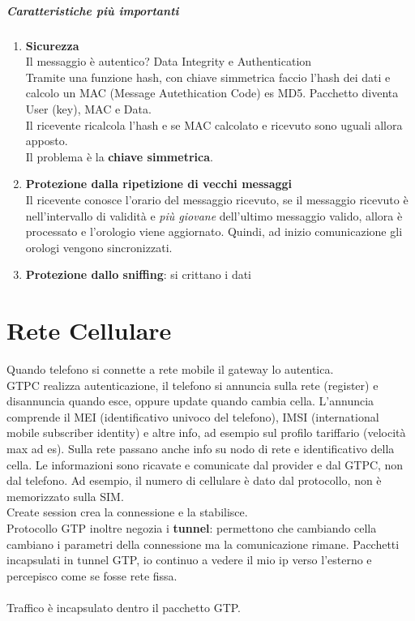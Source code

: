 \documentclass[10pt]{book}
\begin{document}
\paragraph{Caratteristiche più importanti} 
\begin{enumerate}
	\item \textbf{Sicurezza}\\
	Il messaggio è autentico? Data Integrity e Authentication\\
	Tramite una funzione hash, con chiave simmetrica faccio l'hash dei dati e calcolo un MAC (Message Autethication Code) es MD5. Pacchetto diventa User (key), MAC e Data.\\
	Il ricevente ricalcola l'hash e se MAC calcolato e ricevuto sono uguali allora apposto.\\
	Il problema è la \textbf{chiave simmetrica}.
	\item \textbf{Protezione dalla ripetizione di vecchi messaggi}\\
	Il ricevente conosce l'orario del messaggio ricevuto, se il messaggio ricevuto è nell'intervallo di validità e \textit{più giovane} dell'ultimo messaggio valido, allora è processato e l'orologio viene aggiornato. Quindi, ad inizio comunicazione gli orologi vengono sincronizzati.
	\item \textbf{Protezione dallo sniffing}: si crittano i dati
\end{enumerate}
\chapter{Rete Cellulare}
Quando telefono si connette a rete mobile il gateway lo autentica.\\
GTPC realizza autenticazione, il telefono si annuncia sulla rete (register) e disannuncia quando esce, oppure update quando cambia cella. L'annuncia comprende il MEI (identificativo univoco del telefono), IMSI (international mobile subscriber identity) e altre info, ad  esempio sul profilo tariffario (velocità max ad es). Sulla rete passano anche info su nodo di rete e identificativo della cella. Le informazioni sono ricavate e comunicate dal provider e dal GTPC, non dal telefono. Ad esempio, il numero di cellulare è dato dal protocollo, non è memorizzato sulla SIM.\\
Create session crea la connessione e la stabilisce.\\
Protocollo GTP inoltre negozia i \textbf{tunnel}: permettono che cambiando cella cambiano i parametri della connessione ma la comunicazione rimane. Pacchetti incapsulati in tunnel GTP, io continuo a vedere il mio ip verso l'esterno e percepisco come se fosse rete fissa.\\\\
Traffico è incapsulato dentro il pacchetto GTP.
\end{document}
